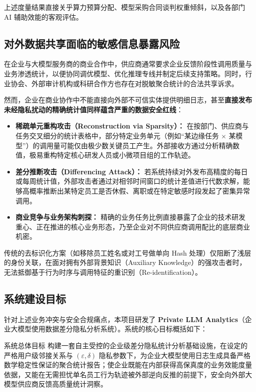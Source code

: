 上述度量结果直接关乎算力预算分配、模型采购合同谈判权重倾斜，以及各部门 AI 辅助效能的客观评估。

\subsection{对外数据共享面临的敏感信息暴露风险}
在企业与大模型服务商的商业合作中，供应商通常要求企业反馈阶段性调用质量与业务渗透统计，以便协同调优模型、优化推理专线并制定后续支持策略。同时，行业协会、外部审计机构或科研合作方也存在对脱敏聚合统计的合法共享诉求。

然而，企业在商业协作中不能直接向外部不可信实体提供明细日志，甚至\textbf{直接发布未经隐私扰动的精确统计值同样蕴含严重的数据安全红线}：
\begin{itemize}[leftmargin=2em]
  \item \textbf{稀疏单元重构攻击（Reconstruction via Sparsity）：} 在按部门、供应商与任务交叉细分的统计表格中，部分特定业务单元（例如“某边缘任务 $\times$ 某模型”）的调用量可能仅由极少数关键员工产生。外部接收方通过分析精确数值，极易重构特定核心研发人员或小微项目组的工作轨迹。
  \item \textbf{差分推断攻击（Differencing Attack）：} 若系统持续对外发布高精度的每日或每周统计值，外部攻击者通过对相邻时间窗口的统计差值进行代数求解，能够高概率推断出某特定员工是否休假、离职或在特定敏感时段发起了密集异常调用。
  \item \textbf{商业竞争与业务架构刺探：} 精确的业务任务比例直接暴露了企业的技术研发重心、正在推进的核心业务形态，乃至企业对不同供应商调用配比的底层商业机密。
\end{itemize}

传统的去标识化方案（如移除员工姓名或对工号做单向 Hash 处理）仅阻断了浅层的身份关联，在面对拥有外部背景知识（Auxiliary Knowledge）的强攻击者时，无法抵御基于行为时序与调用特征的重识别（Re-identification）。

\subsection{系统建设目标}
针对上述业务冲突与安全合规痛点，本项目研发了 \textbf{Private LLM Analytics}（企业大模型使用数据差分隐私分析系统）。系统的核心目标概括如下：
\begin{techbox}{系统总体目标}
构建一套自主受控的企业级差分隐私统计分析基础设施，在设定的严格用户级邻接关系与 $(\varepsilon, \delta)$ 隐私参数下，为企业大模型使用日志生成具备严格数学稳定性保证的聚合统计报告；使企业既能在内部获得高保真度的业务效能度量依据，又能在无需担忧单名员工行为轨迹被外部逆向反推的前提下，安全向外部大模型供应商反馈高质量统计洞察。
\end{techbox}

